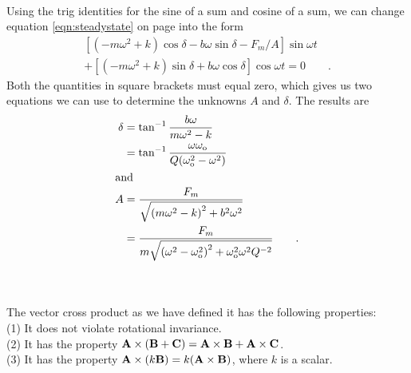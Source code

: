\noindent{}\label{misc:steadystate}\\
	Using the trig identities for the sine of a sum
	and cosine of a sum, we can change equation \eqref{eqn:steadystate}
	on page \pageref{eqn:steadystate} into the form
	\begin{gather*}
		 \left[(-m\omega^2+k)\cos\delta-b\omega\sin\delta-F_m/A\right]\sin\omega t \\
		+  \left[(-m\omega^2+k)\sin\delta+b\omega\cos\delta\right]\cos\omega t
			= 0 \qquad .
	\end{gather*}
	Both the quantities in square brackets must equal zero, which gives us two
	equations we can use to determine the unknowns $A$ and $\delta$. 
	The results are
	\begin{align*}
		\delta &= \tan^{-1}\frac{b\omega}{m\omega^2-k} \\
			&= \tan^{-1}\frac{\omega\omega_{\textup{o}}}
					{Q(\omega_{\textup{o}}^2-\omega^2)} \\
	\intertext{and}
		A &= \frac{F_m}{\sqrt{\left(m\omega^2-k\right)^2+b^2\omega^2}} \\
			&= \frac{F_m}{m\sqrt{\left(\omega^2-\omega_{\textup{o}}^2\right)^2
				+\omega_{\textup{o}}^2\omega^2Q^{-2}}} \qquad .
	\end{align*}
\label{resonance-amplitude}

\noindent{}\label{misc:amproof}\\
\noindent{}\label{misc:uniquexproof}\\
The vector cross product as we have defined it has the
following properties:\\
(1) It does not violate rotational invariance.\\
(2) It has the property $\textbf{A}\times(\textbf{B}+\textbf{C})=\textbf{A}\times\textbf{B}+\textbf{A}\times\textbf{C}$.\\
(3) It has the property $\textbf{A}\times(k\textbf{B})=k(\textbf{A}\times\textbf{B})$, where $k$ is a scalar.


